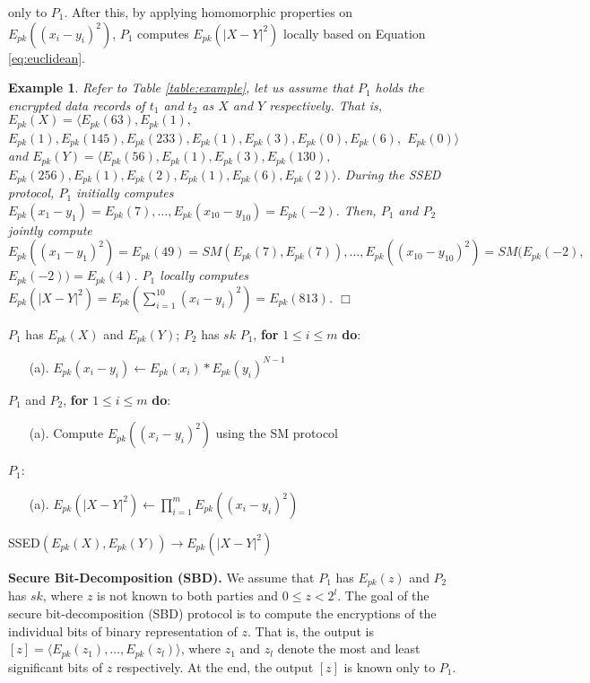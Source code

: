 \documentclass{article}
\newtheorem{example}{Example}
\begin{document}
only to $P_1$. After this, by applying homomorphic properties on $E_{pk}((x_i-y_i)^2)$, $P_1$ 
computes $E_{pk}(|X - Y|^2)$ locally based on Equation \ref{eq:euclidean}.
\begin{example} Refer to Table \ref{table:example}, let us assume that  
$P_1$ holds the encrypted data records of $t_1$ and $t_2$ as $X$ and $Y$ respectively. That is, 
$E_{pk}(X) = \langle E_{pk}(63), E_{pk}(1),$ $E_{pk}(1), E_{pk}(145), E_{pk}(233), 
E_{pk}(1), E_{pk}(3), E_{pk}(0), E_{pk}(6),$ $E_{pk}(0)\rangle$ and   
$E_{pk}(Y) = \langle E_{pk}(56), E_{pk}(1), E_{pk}(3), E_{pk}(130),$ $E_{pk}(256), 
E_{pk}(1), E_{pk}(2), E_{pk}(1), E_{pk}(6), E_{pk}(2)\rangle$. During the SSED protocol,  $P_1$ 
initially computes $E_{pk}(x_1-y_1) = E_{pk}(7), \ldots, E_{pk}(x_{10}-y_{10})= E_{pk}(-2)$. 
Then, $P_1$ and $P_2$ jointly compute $E_{pk}((x_1-y_1)^2) =E_{pk}(49) = SM(E_{pk}(7), E_{pk}(7)),\ldots, E_{pk}((x_{10}-y_{10})^2) 
= SM(E_{pk}(-2),$ $E_{pk}(-2)) = E_{pk}(4)$. $P_1$ locally computes $E_{pk}(|X - Y|^2) = 
E_{pk}(\sum_{i=1}^{10} (x_i - y_i)^2) = E_{pk}(813)$. 
\hfill $\Box$\\
\end{example}
\begin{algorithm}[!t]
\begin{algorithmic}[1]
\REQUIRE $P_1$ has $E_{pk}(X)$ and $E_{pk}(Y)$; $P_2$ has $sk$
\STATE $P_1$, \textbf{for} $1 \leq i \leq m$ \textbf{do}:
\begin{enumerate}\itemsep=0pt
    \item[(a).]  $E_{pk}({x_i-y_i}) \gets E_{pk}({x_i}) \ast E_{pk}(y_i)^{N-1}$   
\end{enumerate}
\STATE $P_1$ and $P_2$, \textbf{for} $1 \leq i \leq m$ \textbf{do}:
\begin{enumerate}\itemsep=0pt
    \item[(a).] Compute $E_{pk}((x_i-y_i)^2)$ using the SM protocol        
\end{enumerate}
\STATE $P_1$:
\begin{enumerate}\itemsep=0pt
\item[(a).] $E_{pk}(|X - Y|^2) \gets \prod_{i=1}^m E_{pk}((x_i - y_i)^2)$
\end{enumerate}
\end{algorithmic}
\caption{SSED$(E_{pk}(X), E_{pk}(Y)) \rightarrow E_{pk}(|X - Y|^2)$ }
\label{alg:ssed}
\end{algorithm}
\noindent \textbf{Secure Bit-Decomposition (SBD). } 
We assume that $P_1$ has $E_{pk}(z)$ and $P_2$ has $sk$, where $z$ is not 
known to both parties and $0 \le z < 2^l$. The goal 
of the secure bit-decomposition (SBD)  
protocol is to compute the encryptions of 
the individual bits of binary representation of $z$\cite{schoenmaker-2006,bksam-asiaccs13}. That is, 
the output is $[z] =  \langle E_{pk}(z_1), \ldots, E_{pk}(z_l) \rangle$, 
where  $z_1$ and $z_l$ 
denote the most and least significant bits of $z$ respectively. At the end, the output $[z]$ is known 
only to $P_1$. 
\end{document}
